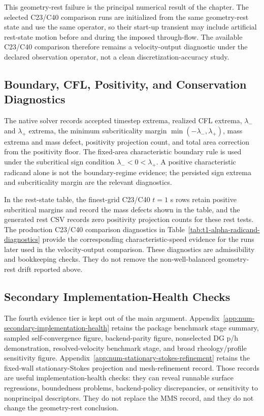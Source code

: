 This geometry-rest failure is the principal numerical result of the chapter.
The selected C23/C40 comparison runs are initialized from the same geometry-rest
state and use the same operator, so their start-up transient may include
artificial rest-state motion before and during the imposed through-flow. The
available C23/C40 comparison therefore remains a velocity-output diagnostic
under the declared observation operator, not a clean discretization-accuracy
study.

\subsection{Boundary, CFL, Positivity, and Conservation Diagnostics}
\label{subsec:boundary-diagnostics}

The native solver records accepted timestep extrema, realized CFL extrema,
$\lambda_-$ and $\lambda_+$ extrema, the minimum subcriticality margin
$\min(-\lambda_-,\lambda_+)$, mass extrema and mass defect, positivity
projection count, and total area correction from the positivity floor. The
fixed-area characteristic boundary rule is used under the subcritical sign
condition $\lambda_-<0<\lambda_+$. A positive characteristic radicand alone is
not the boundary-regime evidence; the persisted sign extrema and subcriticality
margin are the relevant diagnostics.

In the rest-state table, the finest-grid C23/C40 $t=1$ s rows retain
positive subcritical margins and record the mass defects shown in the table, and the generated rest CSV records zero positivity projection counts for
these rest tests. The production C23/C40
comparison diagnostics in Table~\ref{tab:t1-alpha-radicand-diagnostics} provide
the corresponding characteristic-speed evidence for the runs later used in the
velocity-output comparison. These diagnostics are admissibility and bookkeeping
checks. They do not remove the non-well-balanced geometry-rest drift reported
above.

\subsection{Secondary Implementation-Health Checks}
\label{subsec:verification-summary}

The fourth evidence tier is kept out of the main argument. Appendix~\ref{app:num-secondary-implementation-health}
retains the package benchmark stage summary, sampled self-convergence figure,
backend-parity figure, nonselected DG p/h demonstration, resolved-velocity
benchmark stage, and broad rheology/profile sensitivity figure. Appendix~\ref{app:num-stationary-stokes-refinement}
retains the fixed-wall stationary-Stokes projection and mesh-refinement record.
Those records are useful implementation-health checks: they can reveal runnable
surface regressions, boundedness problems, backend-policy discrepancies, or
sensitivity to nonprincipal descriptors. They do not replace the MMS record, and
they do not change the geometry-rest conclusion.

\FloatBarrier
